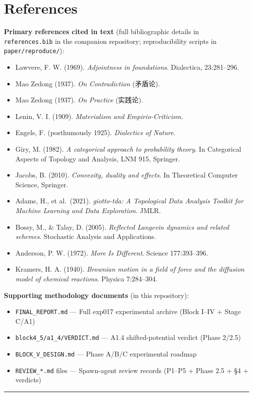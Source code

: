 \documentclass[
]{article}
\providecommand{\tightlist}{%
  \setlength{\itemsep}{0pt}\setlength{\parskip}{0pt}}
\begin{document}
\hypertarget{references}{%
\section{References}\label{references}}

\textbf{Primary references cited in text} (full bibliographic details in
\texttt{references.bib} in the companion repository; reproducibility
scripts in \texttt{paper/reproduce/}):

\begin{itemize}
\tightlist
\item
  Lawvere, F. W. (1969). \emph{Adjointness in foundations}. Dialectica,
  23:281--296.
\item
  Mao Zedong (1937). \emph{On Contradiction} (矛盾论).
\item
  Mao Zedong (1937). \emph{On Practice} (实践论).
\item
  Lenin, V. I. (1909). \emph{Materialism and Empirio-Criticism}.
\item
  Engels, F. (posthumously 1925). \emph{Dialectics of Nature}.
\item
  Giry, M. (1982). \emph{A categorical approach to probability theory}.
  In Categorical Aspects of Topology and Analysis, LNM 915, Springer.
\item
  Jacobs, B. (2010). \emph{Convexity, duality and effects}. In
  Theoretical Computer Science, Springer.
\item
  Adams, H., et al.~(2021). \emph{giotto-tda: A Topological Data
  Analysis Toolkit for Machine Learning and Data Exploration}. JMLR.
\item
  Bossy, M., \& Talay, D. (2005). \emph{Reflected Langevin dynamics and
  related schemes}. Stochastic Analysis and Applications.
\item
  Anderson, P. W. (1972). \emph{More Is Different}. Science
  177:393--396.
\item
  Kramers, H. A. (1940). \emph{Brownian motion in a field of force and
  the diffusion model of chemical reactions}. Physica 7:284--304.
\end{itemize}

\textbf{Supporting methodology documents} (in this repository):

\begin{itemize}
\tightlist
\item
  \texttt{FINAL\_REPORT.md} --- Full exp017 experimental archive (Block
  I--IV + Stage C/A1)
\item
  \texttt{block4\_5/a1\_4/VERDICT.md} --- A1.4 shifted-potential verdict
  (Phase 2/2.5)
\item
  \texttt{BLOCK\_V\_DESIGN.md} --- Phase A/B/C experimental roadmap
\item
  \texttt{REVIEW\_*.md} files --- Spawn-agent review records (P1--P5 +
  Phase 2.5 + §4 + verdicts)
\end{itemize}

\begin{center}\rule{0.5\linewidth}{0.5pt}\end{center}
\end{document}
